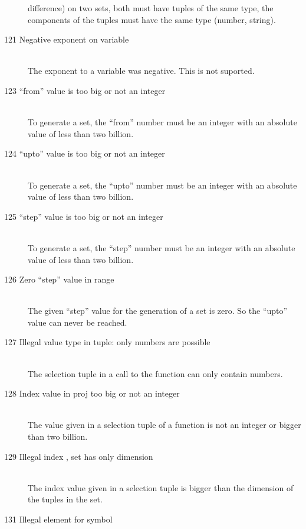 \begin{description}
   difference) on two sets, 
   both must have tuples of the same type,\ie
   the components of the tuples must have the same type (number,
   string).
\item[121 Negative exponent on variable]\ \\
   The exponent to a variable was negative. This is not suported.
\item[123 ``from'' value \code{xxx} is too big or not an
   integer]\ \\
   To generate a set, the ``from'' number must be an integer with an
   absolute value of less than two billion.
\item[124 ``upto'' value \code{xxx} is too big or not an
   integer]\ \\
   To generate a set, the ``upto'' number must be an integer with an
   absolute value of less than two billion.
\item[125 ``step'' value \code{xxx} is too big or not an
   integer]\ \\
   To generate a set, the ``step'' number must be an integer with an
   absolute value of less than two billion.
\item[126 Zero ``step'' value in range]\ \\
   The given ``step'' value for the generation of a set is
   zero. So the ``upto'' value can never be reached. 
\item[127 Illegal value type in tuple: \code{xxx} only numbers are
   possible]\ \\
   The selection tuple in a call to the  function can
   only contain numbers.
\item[128 Index value \code{xxx} in proj too big or not an integer]\ \\
   The value given in a selection tuple of a  function is
   not an integer or bigger than two billion.
\item[129 Illegal index \code{xxx}, set has only dimension
   \code{yyy}]\ \\
   The index value given in a selection tuple is bigger than the
   dimension of the tuples in the set.
\item[131 Illegal element \code{xxx} for symbol]\ \\

\end{description}
